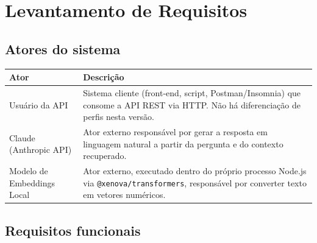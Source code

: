 \documentclass[11pt,a4paper]{article}
\begin{document}
\section{Levantamento de Requisitos}

\subsection{Atores do sistema}

\begin{center}
\begin{tabular}{p{3.2cm}p{10.8cm}}
\toprule
\textbf{Ator} & \textbf{Descrição} \\
\midrule
Usuário da API & Sistema cliente (front-end, script, Postman/Insomnia) que consome a
API REST via HTTP. Não há diferenciação de perfis nesta versão. \\
\addlinespace
Claude (Anthropic API) & Ator externo responsável por gerar a resposta em linguagem
natural a partir da pergunta e do contexto recuperado. \\
\addlinespace
Modelo de Embeddings Local & Ator externo, executado dentro do próprio processo
Node.js via \texttt{@xenova/transformers}, responsável por converter texto em
vetores numéricos. \\
\bottomrule
\end{tabular}
\end{center}

\subsection{Requisitos funcionais}
\end{document}
